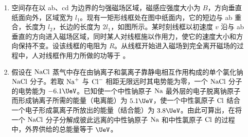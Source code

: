 \documentclass[\gkver]{gaokaozhenti}
\begin{document}
\begin{enumerate}
$\ce{^{235}_{92}U + ^{1}_{0}n -> ^{139}_{54}Xe + ^{94}_{38}Sr + 3^{1}_{0}n}$

$235.0439 \qquad 1.0087 \qquad 138.9178 \qquad 93.9154$

反应方程下方的数字为中子及有关原子的静止质量（以原子质量单位 $\Uu$ 为单位）。已知 $1\Uu$ 的质量对应的能量为 $9.3\times10^{2}\UMeV$，此裂变反应释放出的能量是  $\UMeV$。



\item
空间存在以 ab、cd 为边界的匀强磁场区域，磁感应强度大小为 $B$，方向垂直纸面向外，区域宽为 $l_{1}$。现有一矩形线框处在图中纸面内，它的短边与 ab 重合，长度为 $l_{2}$，长边的长度为 $2l_{1}$，如图所示。某时刻线框以初速度 $v$ 沿与 ab 垂直的方向进入磁场区域，同时某人对线框施以作用力，使它的速度大小和方向保持不变。设该线框的电阻为 $R$。从线框开始进入磁场到完全离开磁场的过程中，人对线框作用力所做的功等于 。



\item
假设在 $\ce{NaCl}$ 蒸气中存在由钠离子和氯离子靠静电相互作用构成的单个氯化钠 $\ce{NaCl}$ 分子。若取 $\ce{Na+}$ 与 $\ce{Cl-}$ 相距无限远时其电势能为零，一个 $\ce{NaCl}$ 分子的电势能为 $-6.1\UeV$。已知使一个中性钠原子 $\ce{Na}$ 最外层的电子脱离钠原子而形成钠离子所需的能量（电离能）为 $5.1\UeV$，使一个中性氯原子 $\ce{Cl}$ 结合一个电子形成氯离子所放出的能量（结合能）为 $3.8\UeV$。由此可算出，在将一个 $\ce{NaCl}$ 分子分解成彼此远离的中性钠原子 $\ce{Na}$ 和中性氯原子 $\ce{Cl}$ 的过程中，外界供给的总能量等于  $\UeV$。


\end{enumerate}
\end{document}
